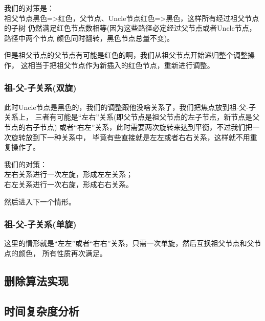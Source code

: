我们的对策是：\\
祖父节点黑色=>红色，父节点、Uncle节点红色=>黑色，这样所有经过祖父节点的子树
仍然满足红色节点数相等(因为这些路径必定经过父节点或者Uncle节点，路径中两个节点
颜色同时翻转，黑色节点总量不变)。

但是祖父节点的父节点有可能是红色的啊，我们从祖父节点开始递归整个调整操作，
这相当于把祖父节点作为新插入的红色节点，重新进行调整。

\subsubsection[祖-父-子关系(双旋)]{祖-父-子关系(双旋)}
此时Uncle节点是黑色的，我们的调整跟他没啥关系了，我们把焦点放到祖-父-子关系上，
三者有可能是“左右”关系(即父节点是祖父节点的左子节点，新节点是父节点的右子节点)
或者“右左”关系，此时需要两次旋转来达到平衡，不过我们把一次旋转放到下一种关系中，
毕竟有些直接就是左左或者右右关系，这样就不用重复操作了。

我们的对策：\\
左右关系进行一次左旋，形成左左关系；\\
右左关系进行一次右旋，形成右右关系。

然后进入下一个情形。

\subsubsection[祖-父-子关系(单旋)]{祖-父-子关系(单旋)}
这里的情形就是“左左”或者“右右”关系，只需一次单旋，然后互换祖父节点和父节点的颜色，
所有性质再次满足。

\subsection[删除算法实现]{删除算法实现}

\subsection[时间复杂度分析]{时间复杂度分析}